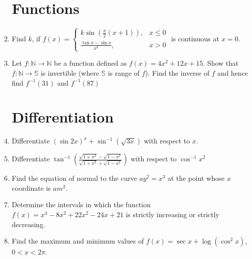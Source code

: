 \documentclass[12pt,-letter paper]{article}
\providecommand{\brak}[1]{\ensuremath{\left(#1\right)}}
\theoremstyle{remark}
\begin{document}
\begin{enumerate}
\section{Functions}
\item Find $k$, if $f(x) = 
    \begin{cases} 
        k \sin \brak{\frac{\pi}{2}\brak{x+1}},& x \leq 0 \\ 
        \frac{\tan x - \sin x}{x^{3}},& x > 0 
    \end{cases}$ is continuous at $x = 0$.
\item Let $f : \mathbb{N} \xrightarrow{} \mathbb{N}$ be a function defined as $f(x) = 4x^{2} + 12x + 15$. Show that $f : \mathbb{N} \xrightarrow{} \mathbb{S}$ is invertible (where $\mathbb{S}$ is range of $f$). Find the inverse of $f$ and hence find $f^{-1}(31)$ and $f^{-1}(87)$
\section{Differentiation}
\item Differentiate $\brak{\sin 2x}^x + \sin^{-1}\brak{\sqrt{3x}}$ with respect to $x$.
\item Differentiate $\tan^{-1}\brak{\frac{\sqrt{1 + x^{2}} - \sqrt{1 - x^{2}}}{\sqrt{1 + x^{2}} + \sqrt{1 - x^{2}}}}$ with respect to $\cos^{-1}x^{2}$
\item Find the equation of normal to the curve $ay^{2} = x^{3}$ at the point whose $x$ coordinate is $am^{2}$.
\item Determine the intervals in which the function $f(x) = x^{4} - 8x^{2} + 22x^{2} - 24x +21$ is strictly increasing or strictly decreasing.
\item Find the maximum and minimum values of $f(x) = \sec x + \log\brak{\cos^{2} x}$, $0 < x < 2\pi$.

\end{enumerate}
\end{document}
